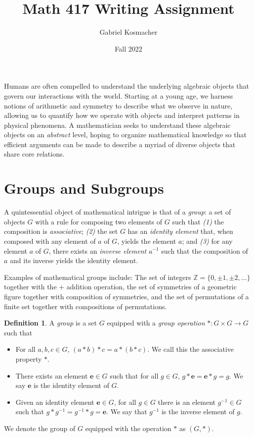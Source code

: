 \documentclass[12pt]{amsart}
\title{Math 417 Writing Assignment}
\author{Gabriel Kosmacher}
\date{Fall 2022}
\theoremstyle{definition}
\newtheorem{definition}[theorem]{Definition}
\theoremstyle{plain}
\def\id{{\mathbf e}}
\def\Z{{\mathbb Z}}
\begin{document}
\maketitle

Humans are often compelled to understand the underlying algebraic objects that govern our interactions with the world. Starting at a young age, we harness notions of arithmetic and symmetry to describe what we observe in nature, allowing us to quantify how we operate with objects and interpret patterns in physical phenomena. A mathematician seeks to understand these algebraic objects on an \emph{abstract} level, hoping to organize mathematical knowledge so that efficient arguments can be made to describe a myriad of diverse objects that share core relations.

\section{Groups and Subgroups}

A quintessential object of mathematical intrigue is that of a \emph{group}: a set of objects $G$ with a rule for composing two elements of $G$ such that \emph{(1)} the composition is \emph{associative}; \emph{(2)} the set $G$ has an \emph{identity element} that, when composed with any element of $a$ of $G$, yields the element $a$; and \emph{(3)} for any element $a$ of $G$, there exists an \emph{inverse element} $a^{-1}$ such that the composition of $a$ and its inverse yields the identity element.

Examples of mathematical groups include: The set of integers $\Z = \{0, \pm 1, \pm 2, \dots \}$ together with the $+$ addition operation, the set of symmetries of a geometric figure together with composition of symmetries, and the set of permutations of a finite set together with compositions of permutations.

\begin{definition}
A \emph{group} is a set $G$ equipped with a \emph{group operation} $*: G \times G \to G$ such that 
\begin{itemize}
    \item For all $a,b,c \in G$, $(a * b) * c = a * (b * c)$. We call this the associative property $*$.
    \item There exists an element $\id \in G$ such that for all $g \in G$, $g*\id = \id*g = g$. We say $\id$ is the identity element of $G$.
    \item Given an identity element $\id \in G$, for all $g \in G$ there is an element $g^{-1} \in G$ such that $g*g^{-1} = g^{-1}*g = \id$. We say that $g^{-1}$ is the inverse element of $g$. 
\end{itemize}
We denote the group of $G$ equipped with the operation $*$ as $\left( G, *\right)$.
\end{definition}
\end{document}
